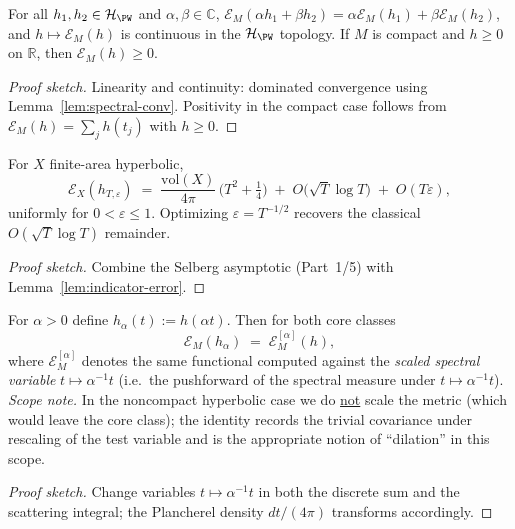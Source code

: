 \begin{theorem}
\label{thm:props-basic}
For all $h_1,h_2\in\mathcal H_{\PW}$ and $\alpha,\beta\in\mathbb C$,
$\mathcal E_M(\alpha h_1+\beta h_2)=\alpha \mathcal E_M(h_1)+\beta \mathcal E_M(h_2)$, and $h\mapsto \mathcal E_M(h)$ is continuous in the $\mathcal H_{\PW}$ topology. If $M$ is compact and $h\ge 0$ on $\mathbb R$, then $\mathcal E_M(h)\ge 0$.
\end{theorem}

\begin{proof}[Proof sketch]
Linearity and continuity: dominated convergence using Lemma~\ref{lem:spectral-conv}. Positivity in the compact case follows from $\mathcal E_M(h)=\sum_j h(t_j)$ with $h\ge 0$.
\end{proof}

\begin{theorem}
\label{thm:balanced-selberg-functional}
For $X$ finite-area hyperbolic,
\[
  \mathcal E_X(h_{T,\varepsilon})
  \;=\; \frac{\mathrm{vol}(X)}{4\pi}\,\big(T^2+\tfrac14\big)
  \;+\; O\!\big(\sqrt{T}\log T\big) \;+\; O(T\varepsilon),
\]
uniformly for $0<\varepsilon\le 1$. Optimizing $\varepsilon=T^{-1/2}$ recovers the classical $O(\sqrt{T}\log T)$ remainder.
\end{theorem}

\begin{proof}[Proof sketch]
Combine the Selberg asymptotic (Part~1/5) with Lemma~\ref{lem:indicator-error}.
\end{proof}

\begin{theorem}
\label{thm:spectral-rescaling}
For $\alpha>0$ define $h_\alpha(t):=h(\alpha t)$. Then for both core classes
\[
  \mathcal E_M(h_\alpha) \;=\; \mathcal E_M^{[\alpha]}\!(h),
\]
where $\mathcal E_M^{[\alpha]}$ denotes the same functional computed against the \emph{scaled spectral variable} $t\mapsto \alpha^{-1}t$ (i.e.\ the pushforward of the spectral measure under $t\mapsto\alpha^{-1}t$). 
\emph{Scope note.} In the noncompact hyperbolic case we do \underline{not} scale the metric (which would leave the core class); the identity records the trivial covariance under rescaling of the test variable and is the appropriate notion of ``dilation'' in this scope.
\end{theorem}

\begin{proof}[Proof sketch]
Change variables $t\mapsto \alpha^{-1}t$ in both the discrete sum and the scattering integral; the Plancherel density $dt/(4\pi)$ transforms accordingly.
\end{proof}

